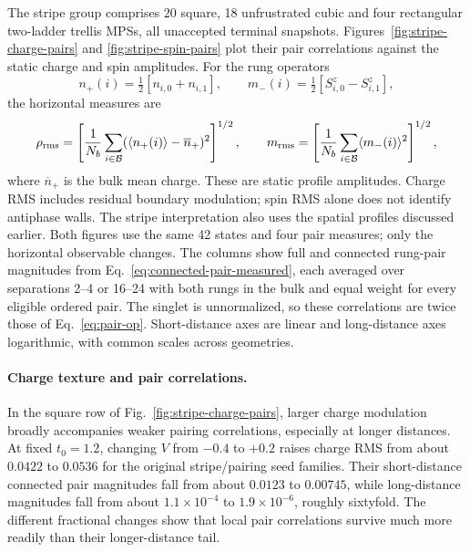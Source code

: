 \documentclass[11pt,letterpaper]{article}
\newcommand{\avg}[1]{\langle #1\rangle}
\begin{document}
The stripe group comprises 20 square, 18 unfrustrated cubic and four
rectangular two-ladder trellis MPSs, all unaccepted terminal snapshots.
Figures~\ref{fig:stripe-charge-pairs} and \ref{fig:stripe-spin-pairs}
plot their pair correlations against the static charge and spin amplitudes.
For the rung operators
\begin{equation}
 n_+(i)=\tfrac12[n_{i,0}+n_{i,1}],\qquad
 m_-(i)=\tfrac12[S^z_{i,0}-S^z_{i,1}],
 \label{eq:rung-charge-spin}
\end{equation}
the horizontal measures are
\begin{equation}
 \rho_{\rm rms}=\left[\frac{1}{N_b}\sum_{i\in\mathcal B}
       (\avg{n_+(i)}-\overline n_+)^2\right]^{1/2},\qquad
 m_{\rm rms}=\left[\frac{1}{N_b}\sum_{i\in\mathcal B}
       \avg{m_-(i)}^2\right]^{1/2},
 \label{eq:stripe-rms-grid}
\end{equation}
where $\overline n_+$ is the bulk mean charge. These are static profile
amplitudes. Charge RMS includes residual
boundary modulation; spin RMS alone does not identify antiphase walls.
The stripe interpretation also uses the spatial profiles discussed earlier.
Both figures use the same 42 states and four pair measures; only the
horizontal observable changes. The columns show full and connected rung-pair magnitudes from
Eq.~\eqref{eq:connected-pair-measured}, each averaged over separations
2--4 or 16--24 with both rungs in the bulk and equal weight for every
eligible ordered pair. The singlet is unnormalized, so these correlations
are twice those of Eq.~\eqref{eq:pair-op}. Short-distance axes are linear
and long-distance axes logarithmic, with common scales across geometries.

\paragraph{Charge texture and pair correlations.}
In the square row of Fig.~\ref{fig:stripe-charge-pairs}, larger charge
modulation broadly accompanies weaker pairing correlations, especially
at longer distances. At fixed $t_0=1.2$, changing $V$ from $-0.4$ to
$+0.2$ raises charge RMS from about $0.0422$ to $0.0536$ for the original
stripe/pairing seed families. Their short-distance connected pair
magnitudes fall from about $0.0123$ to $0.00745$, while long-distance
magnitudes fall from about $1.1\times10^{-4}$ to $1.9\times10^{-6}$,
roughly sixtyfold. The different fractional changes show that local pair
correlations survive much more readily than their longer-distance tail.
\end{document}
